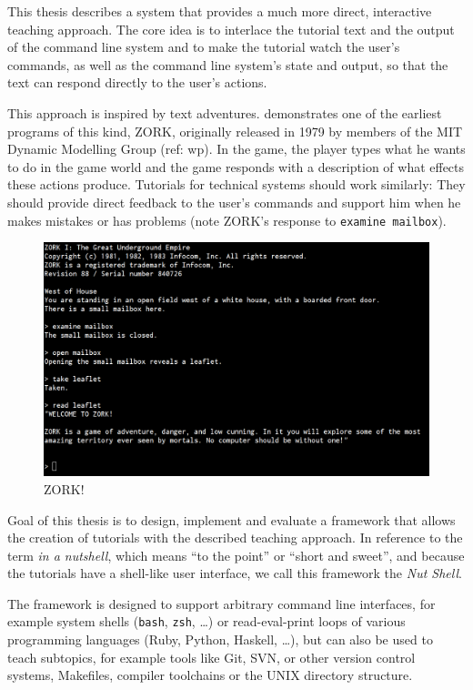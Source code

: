 \documentclass[paper=a4,twoside,abstract=on,cleardoublepage=empty,numbers=noenddot,toc=bib,12pt,appendixprefix=true]{scrreprt}
\begin{document}
This thesis describes a system that provides a much more direct, interactive teaching approach. The core idea is to interlace the tutorial text and the output of the command line system and to make the tutorial watch the user's commands, as well as the command line system's state and output, so that the text can respond directly to the user's actions.

This approach is inspired by text adventures.  demonstrates one of the earliest programs of this kind, \textsc{ZORK}, originally released in 1979 by members of the MIT Dynamic Modelling Group (ref: wp). In the game, the player types what he wants to do in the game world and the game responds with a description of what effects these actions produce. Tutorials for technical systems should work similarly: They should provide direct feedback to the user's commands and support him when he makes mistakes or has problems (note ZORK's response to \texttt{examine mailbox}).

\begin{figure}[tb]
    \includegraphics[width=\textwidth]{zork1.png}
    \centering
    \caption{ZORK!}
    \label{fig:zork}
\end{figure}

Goal of this thesis is to design, implement and evaluate a framework that allows the creation of tutorials with the described teaching approach. In reference to the term \emph{in a nutshell}, which means “to the point” or “short and sweet”, and because the tutorials have a shell-like user interface, we call this framework the \emph{Nut Shell}.

The framework is designed to support arbitrary command line interfaces, for example system shells (\texttt{bash}, \texttt{zsh}, …) or read-eval-print loops of various programming languages (Ruby, Python, Haskell, …), but can also be used to teach subtopics, for example tools like Git, SVN, or other version control systems, Makefiles, compiler toolchains or the UNIX directory structure.
\end{document}
